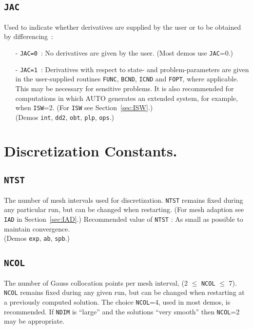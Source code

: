 \documentclass[12pt]{report}
\begin{document}
\subsection{\tt JAC}  \label{sec:JAC}
 Used to indicate whether derivatives are supplied by the user
 or to be obtained by differencing~:
\begin{itemize}
\item[-] {\tt JAC=0}~: 
  No derivatives are given by the user. (Most demos use {\tt JAC}=0.)
\item[-] {\tt JAC=1}~:  
  Derivatives with respect to state- and problem-parameters are given 
  in the user-supplied routines 
  {\tt FUNC}, {\tt BCND}, {\tt ICND} and {\tt FOPT}, where 
  applicable.  This may be necessary for sensitive problems. 
  It is also recommended for computations in which {\cal AUTO} generates 
  an extended system, for example, when {\tt ISW}=2.
  (For {\tt ISW} see Section~\ref{sec:ISW}.) \\
(Demos {\tt int}, {\tt dd2}, {\tt obt}, {\tt plp}, {\tt ops}.)
\end{itemize}
\section{ Discretization Constants.} \label{sec:Discretization_constants}
\subsection{\tt NTST}  \label{sec:NTST}
 The number of mesh intervals used for discretization.
 {\tt NTST} remains fixed during any particular run, but can be changed
 when restarting. 
 (For mesh adaption see {\tt IAD} in Section~\ref{sec:IAD}.)
 Recommended value of {\tt NTST} : As small as possible to maintain convergence. \\ 
 (Demos {\tt exp}, {\tt ab}, {\tt spb}.)


\subsection{\tt NCOL}  \label{sec:NCOL}
 The number of Gauss collocation points per mesh interval,
 (2 $\le$ {\tt NCOL} $\le$ 7).
 {\tt NCOL} remains fixed during any given run, but can be changed
 when restarting at a previously computed solution.
 The choice {\tt NCOL}=4, used in most demos, is recommended.
 If {\tt NDIM} is ``large'' and the solutions ``very smooth'' then
 {\tt NCOL}=2 may be appropriate.
\end{document}
